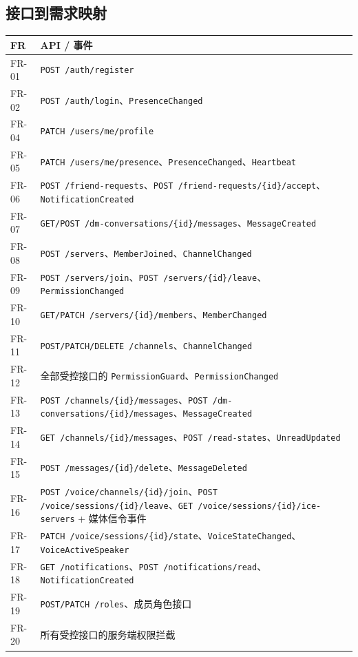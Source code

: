 \subsection{接口到需求映射}

\noindent\begin{tabularx}{\textwidth}{L{1.8cm}Y}
  \toprule
  FR & API / 事件 \\
  \midrule
  FR-01 & \texttt{POST /auth/register} \\
  FR-02 & \texttt{POST /auth/login}、\texttt{PresenceChanged} \\
  FR-04 & \texttt{PATCH /users/me/profile} \\
  FR-05 & \texttt{PATCH /users/me/presence}、\texttt{PresenceChanged}、\texttt{Heartbeat} \\
  FR-06 & \texttt{POST /friend-requests}、\texttt{POST /friend-requests/\{id\}/accept}、\texttt{NotificationCreated} \\
  FR-07 & \texttt{GET/POST /dm-conversations/\{id\}/messages}、\texttt{MessageCreated} \\
  FR-08 & \texttt{POST /servers}、\texttt{MemberJoined}、\texttt{ChannelChanged} \\
  FR-09 & \texttt{POST /servers/join}、\texttt{POST /servers/\{id\}/leave}、\texttt{PermissionChanged} \\
  FR-10 & \texttt{GET/PATCH /servers/\{id\}/members}、\texttt{MemberChanged} \\
  FR-11 & \texttt{POST/PATCH/DELETE /channels}、\texttt{ChannelChanged} \\
  FR-12 & 全部受控接口的 \texttt{PermissionGuard}、\texttt{PermissionChanged} \\
  FR-13 & \texttt{POST /channels/\{id\}/messages}、\texttt{POST /dm-conversations/\{id\}/messages}、\texttt{MessageCreated} \\
  FR-14 & \texttt{GET /channels/\{id\}/messages}、\texttt{POST /read-states}、\texttt{UnreadUpdated} \\
  FR-15 & \texttt{POST /messages/\{id\}/delete}、\texttt{MessageDeleted} \\
  FR-16 & \texttt{POST /voice/channels/\{id\}/join}、\texttt{POST /voice/sessions/\{id\}/leave}、\texttt{GET /voice/sessions/\{id\}/ice-servers} + 媒体信令事件 \\
  FR-17 & \texttt{PATCH /voice/sessions/\{id\}/state}、\texttt{VoiceStateChanged}、\texttt{VoiceActiveSpeaker} \\
  FR-18 & \texttt{GET /notifications}、\texttt{POST /notifications/read}、\texttt{NotificationCreated} \\
  FR-19 & \texttt{POST/PATCH /roles}、成员角色接口 \\
  FR-20 & 所有受控接口的服务端权限拦截 \\
  \bottomrule
\end{tabularx}

